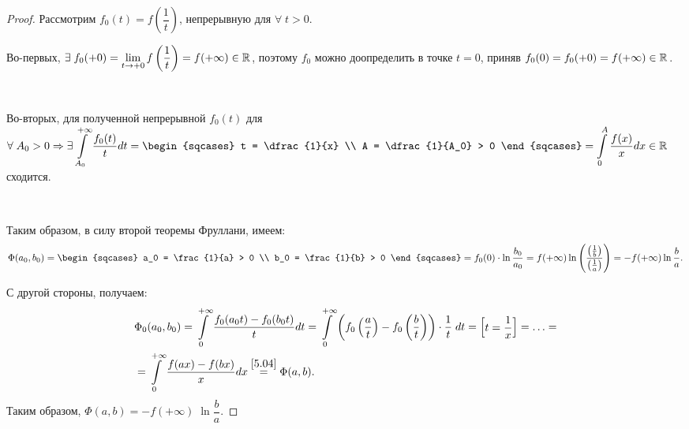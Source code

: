 \begin{proof}
	Рассмотрим $ f_0(t) = f\left(\dfrac{1}{t}\right)  $, непрерывную для $ \forall \; t > 0 $.

	Во-первых,
	$ \exists \; f_0(+0) = \lim\limits_{t \to +0} f \left(\dfrac{1}{t}\right) = f (+\infty ) \in \mathbb{R}^{}$,
	поэтому $ f_0 $ можно доопределить в точке $ t = 0 $, приняв \newline
	$ f_0(0) = f_0(+0) = f(+\infty) \in \mathbb{R}^{} $.

	$  $

	Во-вторых, для полученной непрерывной $f_0(t) $ для
	$ \forall \; A_0 > 0 \Rightarrow \exists \dintl_{A_0}^{+\infty} \dfrac{f_0(t)}{t} dt =
	\begin{sqcases}
	t = \dfrac{1}{x} \\
	A = \dfrac{1}{A_0} > 0
	\end{sqcases}
	=
	\dintl_0^A \dfrac{f(x)}{x} dx \in \R{} $
	сходится.

	$  $

	Таким образом, в силу второй теоремы Фруллани, имеем:
	\begin{equation*}
	\Phi (a_0, b_0)
	= \begin{sqcases}
	a_0 = \frac{1}{a} > 0 \\
	b_0 = \frac{1}{b} > 0
	\end{sqcases}
	= f_0 (0) \cdot \ln \dfrac{b_0}{a_0}
	= f(+\infty) \ln \left(\dfrac{\parenthesis{\frac{1}{b}}}{\parenthesis{\frac{1}{a}}}\right)
	= - f(+\infty) \ln \frac{b}{a}.
	\end{equation*}

	С другой стороны, получаем:
	\begin{align*}
	& \Phi_0 (a_0, b_0)
	= \displaystyle\int\limits_0^{+\infty} \dfrac{f_0(a_0 t)-f_0(b_0 t)}{t} dt
	= \displaystyle\int\limits_0^{+ \infty} \left(f_0 \left(\dfrac{a}{t} \right) - f_0 \left(\dfrac{b}{t} \right) \right) \cdot \dfrac{1}{t} \; dt = \left[\begin{matrix} t = \dfrac{1}{x} \end{matrix}\right]
	= \ldots
	= \\ &
	= \displaystyle\int\limits_0^{+\infty} \dfrac{f(ax)-f(bx)}{x} dx
	\overset{\eqref{5.04}}{=} \Phi (a, b).
	\end{align*}
	Таким образом, $ \Phi (a, b) = - f(+\infty) \; \ln \dfrac{b}{a}. $
\end{proof}
